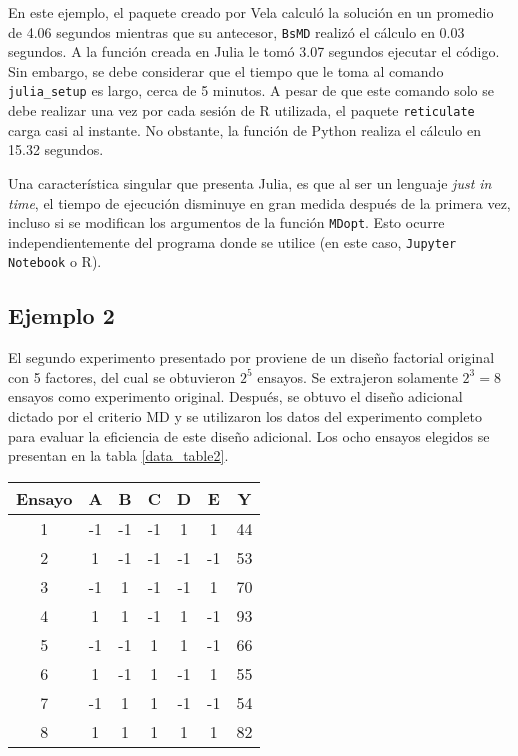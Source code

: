 En este ejemplo, el paquete creado por Vela calculó la solución en un promedio de 4.06 segundos mientras que su antecesor, \texttt{BsMD} realizó el cálculo en 0.03 segundos. A la función creada en \textsf{Julia} le tomó 3.07 segundos ejecutar el código. Sin embargo, se debe considerar que el tiempo que le toma al comando \texttt{julia\_setup} es largo, cerca de 5 minutos. A pesar de que este comando solo se debe realizar una vez por cada sesión de \textsf{R} utilizada, el paquete \texttt{reticulate} carga casi al instante. No obstante, la función de \textsf{Python} realiza el cálculo en 15.32 segundos.  

Una característica singular que presenta \textsf{Julia}, es que al ser un lenguaje \textit{just in time}, el tiempo de ejecución disminuye en gran medida después de la primera vez, incluso si se modifican los argumentos de la función \texttt{MDopt}. Esto ocurre independientemente del programa donde se utilice (en este caso, \texttt{Jupyter Notebook} o \textsf{R}).  


\subsection{Ejemplo 2}
El segundo experimento presentado por \cite{meyer1996} proviene de un diseño factorial original con 5 factores, del cual se obtuvieron $2^{5}$ ensayos. Se extrajeron solamente $2^{3} = 8$ ensayos como experimento original. Después, se obtuvo el diseño adicional dictado por el criterio MD y se utilizaron los datos del experimento completo para evaluar la eficiencia de este diseño adicional. Los ocho ensayos elegidos se presentan en la tabla \ref{data_table2}. 

\begin{center}
	\begin{tabular}{cccccc|c}
		Ensayo & A & B & C & D & E & Y \\
		\hline
		1 & -1 & -1 & -1 & 1 & 1 & 44 \\
		
		2 & 1 & -1 & -1 & -1 & -1 & 53 \\
		
		3 & -1 & 1 & -1 & -1 & 1 & 70 \\
		
		4 & 1 & 1 & -1 & 1 & -1 & 93 \\
		
		5 & -1 & -1 & 1 & 1 & -1 & 66 \\

		6 & 1 & -1 & 1 & -1 & 1 & 55 \\
		
		7 & -1 & 1 & 1 & -1 & -1 & 54 \\
		
		8 & 1 & 1 & 1 & 1 & 1 & 82 \\	
		
	\end{tabular}
	 \label{data_table2}
\end{center}

